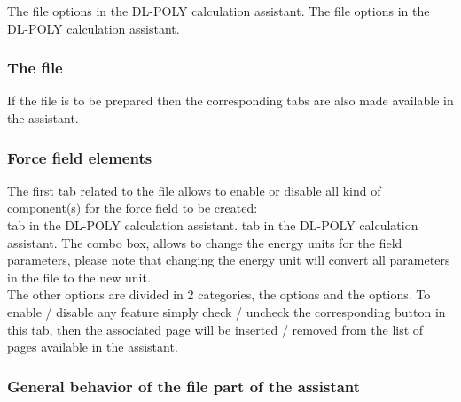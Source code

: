 {The  file options in the DL-POLY calculation assistant.}
{The  file options in the DL-POLY calculation assistant.}

\clearpage

\subsubsection{The  file}

If the  file is to be prepared then the corresponding tabs are also made available in the assistant. 

\subsubsection*{Force field elements}

The first tab related to the  file allows to enable or disable all kind of component(s) for the force field to be created: \\
{ tab in the DL-POLY calculation assistant.}
{ tab in the DL-POLY calculation assistant.}
\laf The  combo box, allows to change the energy units for the field parameters, 
please note that changing the energy unit will convert all parameters in the  file to the new unit. \\[0.25cm]
The other options are divided in 2 categories, the  options and the  options. 
To enable / disable any feature simply check / uncheck the corresponding button in this tab, then the associated page will 
be inserted / removed from the list of pages available in the assistant.

\clearpage
\subsubsection*{General behavior of the  file part of the assistant}

